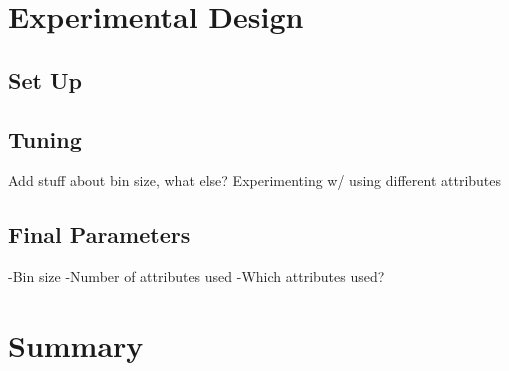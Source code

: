 \documentclass[twoside,11pt]{article}
\begin{document}
\section{Experimental Design}

\subsection{Set Up}


\subsection{Tuning}

Add stuff about bin size, what else? \newline
Experimenting w/ using different attributes

\subsection{Final Parameters}

-Bin size \newline
-Number of attributes used \newline
-Which attributes used? \newline

\section{Summary}


\end{document}
